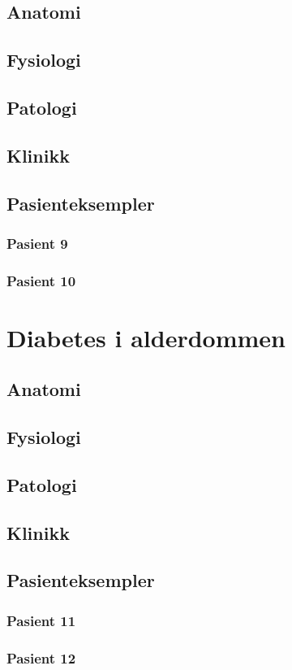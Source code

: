 \documentclass[a4paper,12pt,twoside]{memoir}
\begin{document}
		\section{Anatomi}
		\section{Fysiologi}
		\section{Patologi}
		\section{Klinikk}
		\section{Pasienteksempler}
			\subsection{Pasient 9}
			\subsection{Pasient 10}
	\chapter{Diabetes i alderdommen}
		\section{Anatomi}
		\section{Fysiologi}
		\section{Patologi}
		\section{Klinikk}
		\section{Pasienteksempler}
			\subsection{Pasient 11}
			\subsection{Pasient 12}

 

 \renewcommand{\bibname}{Kilder:}
            {}
			
\end{document}
